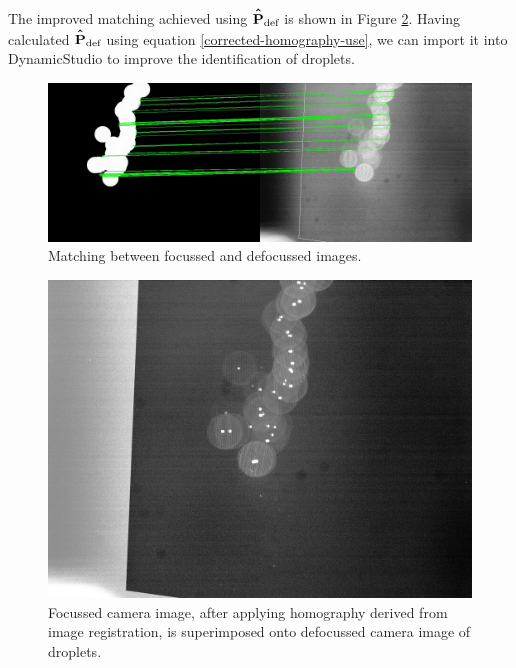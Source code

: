 \documentclass[10pt]{book}
\newcommand*{\Phat}{\hat{\vphantom{\scalebox{1.2}{P}} P}}
\begin{document}
The improved matching achieved using $\mathbf{\Phat}_\text{def}$ is shown in
Figure \ref{fig:drop-calibration-corrected}. Having calculated $\mathbf{\Phat}_\text{def}$ using
equation \eqref{corrected-homography-use}, we can import it into DynamicStudio
to improve the identification of droplets.

\begin{figure}[t]
    \centering
    \includegraphics[width=\textwidth]{img/asift-matching.jpg}
    \caption{Matching between focussed and defocussed images.}
    \label{fig:asift-matching}
\end{figure}

\begin{figure}[t]
    \centering
    \includegraphics[width=0.45\textheight]{img/drop-calibration-corrected.jpg}
    \caption{Focussed camera image, after applying homography
        derived from image registration, is superimposed onto defocussed
    camera image of droplets.}
    \label{fig:drop-calibration-corrected}
\end{figure}

\end{document}
